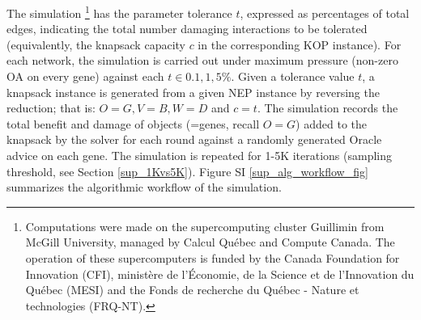 \documentclass[12pt]{article}	%
\begin{document}
			The simulation
			\footnote{\scriptsize{Computations were made on the supercomputing cluster Guillimin from McGill University, managed by Calcul Québec and Compute Canada. The operation of these supercomputers is funded by the Canada Foundation for Innovation (CFI), ministère de l’Économie, de la Science et de l’Innovation du Québec (MESI) and the Fonds de recherche du Québec - Nature et technologies (FRQ-NT).}}
            has the parameter tolerance $t$, expressed as percentages of total edges,  indicating the total number damaging interactions to
			be tolerated (equivalently, the knapsack capacity $c$ in the
			corresponding KOP instance).
			For each network, the simulation is carried out under maximum pressure (non-zero OA on every gene)
			against each $t \in {0.1, 1, 5}\%$.
			Given a tolerance value $t$, a knapsack instance is generated from a given NEP instance by reversing the reduction;
			that is: $O=G, V=B, W=D$ and $c=t$. The simulation records the total benefit and damage of objects (=genes, recall $O=G$)
			added to the knapsack by the solver  \cite{pisinger_where_2005} for each round against a randomly generated Oracle advice on each gene.
			The simulation is repeated for 1-5K iterations (sampling threshold, see Section \ref{sup_1Kvs5K}). Figure SI \ref{sup_alg_workflow_fig} summarizes the algorithmic workflow of the simulation.

\end{document}
